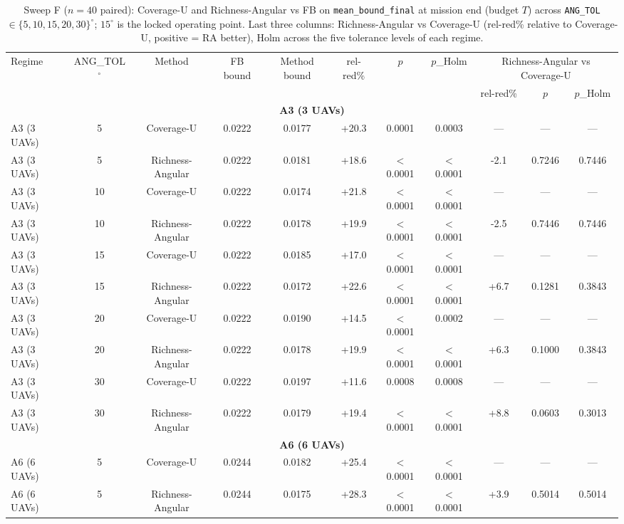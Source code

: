 \documentclass[journal]{IEEEtran}
\newcommand{\CU}{Coverage-U}
\newcommand{\RA}{Richness-Angular}
\begin{document}
\begin{table}[t]
\caption{Sweep F ($n = 40$ paired): \CU{} and \RA{} vs FB on \texttt{mean\_bound\_final} at mission end (budget $T$) across \texttt{ANG\_TOL} $\in \{5,10,15,20,30\}^\circ$; $15^\circ$ is the locked operating point. Last three columns: \RA{} vs \CU{} (rel-red\% relative to \CU{}, positive = RA better), Holm across the five tolerance levels of each regime.}
\label{tab:sweepF}
\centering
\setlength{\tabcolsep}{5.5pt}
\begin{tabular}{l c c c c c c c c c c}
\toprule
Regime & ANG\_TOL$^\circ$ & Method & FB bound & Method bound & rel-red\% & $p$ & $p$\_Holm & \multicolumn{3}{c}{\RA{} vs \CU{}} \\
\cmidrule(lr){9-11}
& & & & & & & & rel-red\% & $p$ & $p$\_Holm \\
\midrule
\multicolumn{11}{c}{\textbf{A3 (3 UAVs)}} \\
\midrule
A3 (3 UAVs) & 5 & \CU & 0.0222 & 0.0177 & +20.3 & 0.0001 & 0.0003 & --- & --- & --- \\
A3 (3 UAVs) & 5 & \RA & 0.0222 & 0.0181 & +18.6 & $<$0.0001 & $<$0.0001 & -2.1 & 0.7246 & 0.7446 \\
A3 (3 UAVs) & 10 & \CU & 0.0222 & 0.0174 & +21.8 & $<$0.0001 & $<$0.0001 & --- & --- & --- \\
A3 (3 UAVs) & 10 & \RA & 0.0222 & 0.0178 & +19.9 & $<$0.0001 & $<$0.0001 & -2.5 & 0.7446 & 0.7446 \\
A3 (3 UAVs) & 15 & \CU & 0.0222 & 0.0185 & +17.0 & $<$0.0001 & $<$0.0001 & --- & --- & --- \\
A3 (3 UAVs) & 15 & \RA & 0.0222 & 0.0172 & +22.6 & $<$0.0001 & $<$0.0001 & +6.7 & 0.1281 & 0.3843 \\
A3 (3 UAVs) & 20 & \CU & 0.0222 & 0.0190 & +14.5 & $<$0.0001 & 0.0002 & --- & --- & --- \\
A3 (3 UAVs) & 20 & \RA & 0.0222 & 0.0178 & +19.9 & $<$0.0001 & $<$0.0001 & +6.3 & 0.1000 & 0.3843 \\
A3 (3 UAVs) & 30 & \CU & 0.0222 & 0.0197 & +11.6 & 0.0008 & 0.0008 & --- & --- & --- \\
A3 (3 UAVs) & 30 & \RA & 0.0222 & 0.0179 & +19.4 & $<$0.0001 & $<$0.0001 & +8.8 & 0.0603 & 0.3013 \\
\multicolumn{11}{c}{\textbf{A6 (6 UAVs)}} \\
\midrule
A6 (6 UAVs) & 5 & \CU & 0.0244 & 0.0182 & +25.4 & $<$0.0001 & $<$0.0001 & --- & --- & --- \\
A6 (6 UAVs) & 5 & \RA & 0.0244 & 0.0175 & +28.3 & $<$0.0001 & $<$0.0001 & +3.9 & 0.5014 & 0.5014 \\

\end{tabular}
\end{table}
\end{document}
